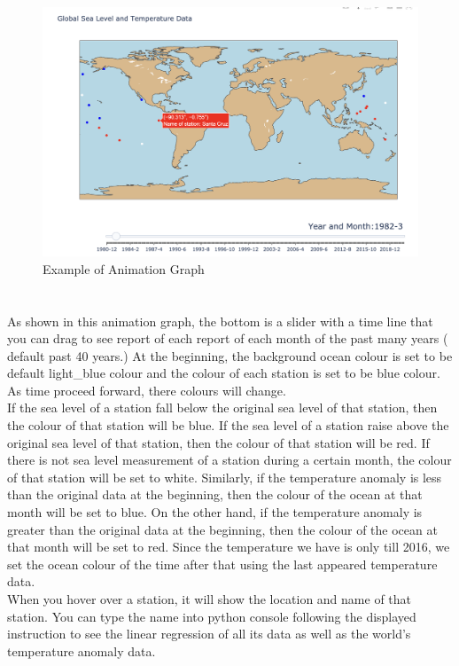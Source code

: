 \documentclass[fontsize=11pt]{article}
\begin{document}
    \begin{figure}[h!]
    \centering
    \includegraphics[scale=0.5]{sample_animation_graph.png}
    \caption{Example of Animation Graph}
    \label{fig:sample_animation_graph.png}
    \end{figure}
   
    \section*{}
   As shown in this animation graph, the bottom is a slider with a time line that you can drag to see report of each report of each month of the past many years ( default past 40 years.) At the beginning, the background ocean colour is set to be default light\_blue colour and the colour of each station is set to be blue colour. As time proceed forward, there colours will change. \\
   If the sea level of a station fall below the original sea level of that station, then the colour of that station will be blue. If the sea level of a station raise above the original sea level of that station, then the colour of that station will be red. If there is not sea level measurement of a station during a certain month, the colour of that station will be set to white. 
   Similarly, if the temperature anomaly is less than the original data at the beginning, then the colour of the ocean at that month will be set to blue. On the other hand, if the temperature anomaly is greater than the original data at the beginning, then the colour of the ocean at that month will be set to red. Since the temperature we have is only till 2016, we set the ocean colour of the time after that using the last appeared temperature data.\\
   When you hover over a station, it will show the location and name of that station. You can type the name into python console following the displayed instruction to see the linear regression of all its data as well as the world's temperature anomaly data.\\
   
\end{document}
